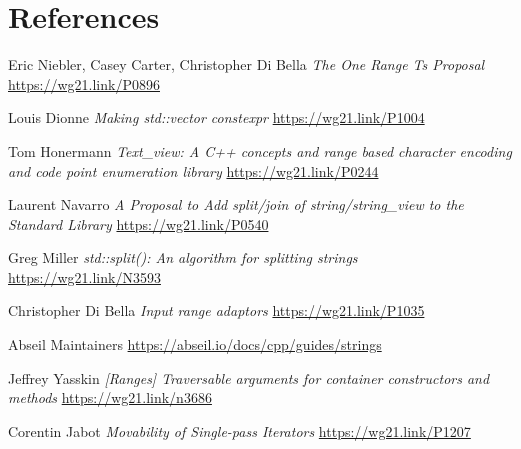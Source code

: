 \documentclass{wg21}
\begin{document}
\section{References}
\renewcommand{\section}[2]{}%
\begin{thebibliography}{9}

    Eric Niebler, Casey Carter, Christopher Di Bella
    \emph{The One Range Ts Proposal}\newline
    \url{https://wg21.link/P0896}

    Louis Dionne
    \emph{Making std::vector constexpr}\newline
    \url{https://wg21.link/P1004}

    Tom Honermann
    \emph{Text_view: A C++ concepts and range based character encoding and code point enumeration library}\newline
    \url{https://wg21.link/P0244}

    Laurent Navarro
    \emph{A Proposal to Add split/join of string/string_view to the Standard Library}\newline
    \url{https://wg21.link/P0540}

    Greg Miller
    \emph{std::split(): An algorithm for splitting strings}\newline
    \url{https://wg21.link/N3593}

    Christopher Di Bella
    \emph{Input range adaptors}\newline
    \url{https://wg21.link/P1035}

    Abseil Maintainers
    \url{https://abseil.io/docs/cpp/guides/strings}

    Jeffrey Yasskin
    \emph{[Ranges] Traversable arguments for container constructors and methods}\newline
    \url{https://wg21.link/n3686}
    
	Corentin Jabot
	\emph{Movability of Single-pass Iterators}\newline
	\url{https://wg21.link/P1207}

\end{thebibliography}
\end{document}

